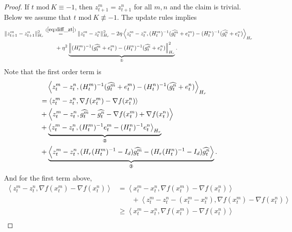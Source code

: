 \documentclass{article} %
\numberwithin{equation}{section}
\newcommand{\cirone}{\text{\ding{172}}}
\newcommand{\cirtwo}{\text{\ding{173}}}
\newcommand{\cirthree}{\text{\ding{174}}}
\renewcommand{\eqref}[1]{(\ref{#1})}
\begin{document}
\begin{proof}
    If $t \text{ mod}\ K \equiv -1$, then $z_{t+1}^m=z_{t+1}^n$ for all $m,n$ and the claim is trivial. 
    Below we assume that $t \text{ mod}\ K \not\equiv -1$.
    The update rules implies
    \begin{equation}\label{eq:contraction_expansion}
        \begin{aligned}
            \|z_{t+1}^m-z_{t+1}^n\|_{H_r}^2
            &\overset{\eqref{eq:diff_zt}}{=} \|z_t^m-z_t^n\|_{H_r}^2 - 2\eta \left\langle z_t^m-z_t^n, (H_t^m)^{-1}(\widehat{g_t^m}+e_t^m) - (H_t^n)^{-1}(\widehat{g_t^n}+e_t^n)\right\rangle_{H_r} \\
            &\qquad + \eta^2\underbrace{\left\| (H_t^m)^{-1}(\widehat{g_t^m}+e_t^m) - (H_t^n)^{-1}(\widehat{g_t^n}+e_t^n) \right\|_{H_r}^2}_{\cirone}.
        \end{aligned}
    \end{equation}
    Note that the first order term is
    \begin{equation}\label{eq:18}
        \begin{aligned}
            &\quad \left\langle z_t^m-z_t^n, (H_t^m)^{-1}(\widehat{g_t^m}+e_t^m) - (H_t^n)^{-1}(\widehat{g_t^n}+e_t^n)\right\rangle_{H_r} \\
            &= \left\langle z_t^m-z_t^n, \nabla f(x_t^m)-\nabla f(x_t^n) \right\rangle \\
            &+ \left\langle z_t^m-z_t^n, \widehat{g_t^m}-\widehat{g_t^n}-\nabla f(x_t^m)+\nabla f(x_t^n) \right\rangle \\
            &+ \underbrace{\left\langle z_t^m-z_t^n, (H_t^m)^{-1}e_t^m - (H_t^n)^{-1}e_t^n \right\rangle_{H_r}}_{\cirtwo}\\
            &+ \underbrace{\left\langle z_t^m-z_t^n, (H_r(H_t^m)^{-1}-I_d)\widehat{g_t^m} - (H_r(H_t^n)^{-1}-I_d)\widehat{g_t^n} \right\rangle}_{\cirthree}.
        \end{aligned}
    \end{equation}
    And for the first term above,
    \begin{equation}\label{eq:1}
        \begin{aligned}
            \left\langle z_t^m-z_t^n, \nabla f(x_t^m)-\nabla f(x_t^n) \right\rangle
            &= \left\langle x_t^m-x_t^n, \nabla f(x_t^m)-\nabla f(x_t^n) \right\rangle \\
            &\qquad + \left\langle z_t^m-z_t^n-(x_t^m-x_t^n), \nabla f(x_t^m)-\nabla f(x_t^n) \right\rangle \\
            &\geq \left\langle x_t^m-x_t^n, \nabla f(x_t^m)-\nabla f(x_t^n) \right\rangle \\

\end{aligned}
\end{equation}
\end{proof}
\end{document}
